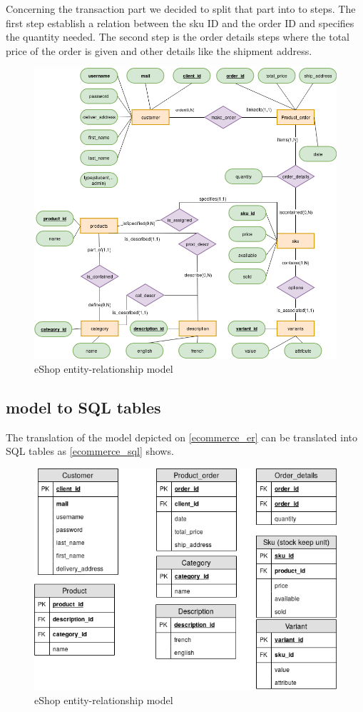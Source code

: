 \documentclass{article}
\begin{document}
Concerning the transaction part we decided to split that part into to steps. The first step establish a relation between the sku ID and the order ID and specifies the quantity needed. The second step is the order details steps where the total price of the order is given and other details like the shipment address.

\begin{figure}[h!]
    \centering
    \includegraphics[scale=0.4]{./images/ecommerce_ER.png}
    \caption{eShop entity-relationship model}
    \label{ecommerce_er}
\end{figure}

\subsection{model to SQL tables}
The translation of the model depicted on \autoref{ecommerce_er} can be translated into SQL tables as \autoref{ecommerce_sql} shows.
\begin{figure}[h!]
    \centering
    \includegraphics[scale=0.4]{./images/ecommerce_SQL.png}
    \caption{eShop entity-relationship model}
    \label{ecommerce_sql}
\end{figure}
\end{document}
